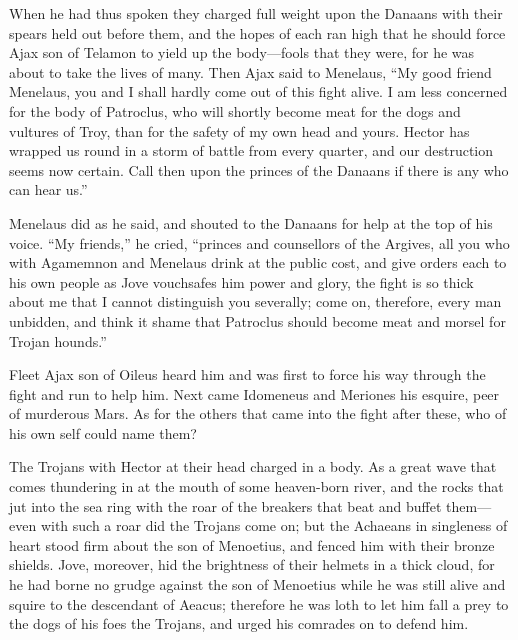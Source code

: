 When he had thus spoken they charged full weight upon the Danaans with
their spears held out before them, and the hopes of each ran high that he
should force Ajax son of Telamon to yield up the body—fools that
they were, for he was about to take the lives of many. Then Ajax said to
Menelaus, “My good friend Menelaus, you and I shall hardly come out of
this fight alive. I am less concerned for the body of Patroclus, who will
shortly become meat for the dogs and vultures of Troy, than for the safety
of my own head and yours. Hector has wrapped us round in a storm of battle
from every quarter, and our destruction seems now certain. Call then upon
the princes of the Danaans if there is any who can hear us.”

Menelaus did as he said, and shouted to the Danaans for help at the top of
his voice. “My friends,” he cried, “princes and counsellors of the
Argives, all you who with Agamemnon and Menelaus drink at the public cost,
and give orders each to his own people as Jove vouchsafes him power and
glory, the fight is so thick about me that I cannot distinguish you
severally; come on, therefore, every man unbidden, and think it shame that
Patroclus should become meat and morsel for Trojan hounds.”

Fleet Ajax son of Oileus heard him and was first to force his way through
the fight and run to help him. Next came Idomeneus and Meriones his
esquire, peer of murderous Mars. As for the others that came into the
fight after these, who of his own self could name them?

The Trojans with Hector at their head charged in a body. As a great wave
that comes thundering in at the mouth of some heaven-born river, and the
rocks that jut into the sea ring with the roar of the breakers that beat
and buffet them—even with such a roar did the Trojans come on; but
the Achaeans in singleness of heart stood firm about the son of Menoetius,
and fenced him with their bronze shields. Jove, moreover, hid the
brightness of their helmets in a thick cloud, for he had borne no grudge
against the son of Menoetius while he was still alive and squire to the
descendant of Aeacus; therefore he was loth to let him fall a prey to the
dogs of his foes the Trojans, and urged his comrades on to defend him.

